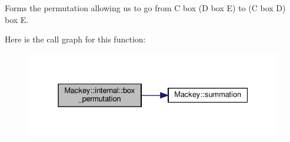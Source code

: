 Forms the permutation allowing us to go from C box (D box E) to (C box D) box E. 

Here is the call graph for this function\+:\nopagebreak
\begin{figure}[H]
\begin{center}
\leavevmode
\includegraphics[width=331pt]{namespaceMackey_1_1internal_a32720f4fc1f6777a8e13a2e0db0bd2da_cgraph}
\end{center}
\end{figure}
